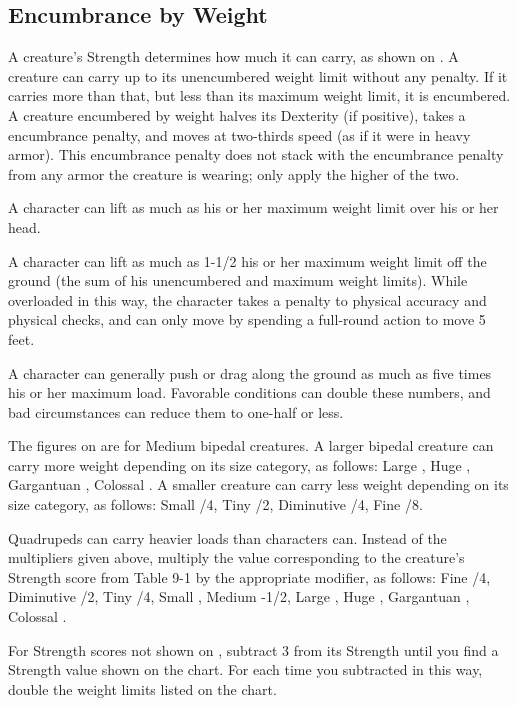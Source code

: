 \subsection{Encumbrance by Weight}
A creature's Strength determines how much it can carry, as shown on . A creature can carry up to its unencumbered weight limit without any penalty. If it carries more than that, but less than its maximum weight limit, it is encumbered. A creature encumbered by weight halves its Dexterity (if positive), takes a  encumbrance penalty, and moves at two-thirds speed (as if it were in heavy armor). This encumbrance penalty does not stack with the encumbrance penalty from any armor the creature is wearing; only apply the higher of the two.

 A character can lift as much as his or her maximum weight limit over his or her head.

A character can lift as much as 1-1/2 his or her maximum weight limit off the ground (the sum of his unencumbered and maximum weight limits). While overloaded in this way, the character takes a  penalty to physical accuracy and physical checks, and can only move by spending a full-round action to move 5 feet.

A character can generally push or drag along the ground as much as five times his or her maximum load. Favorable conditions can double these numbers, and bad circumstances can reduce them to one-half or less.

 The figures on  are for Medium bipedal creatures. A larger bipedal creature can carry more weight depending on its size category, as follows: Large , Huge , Gargantuan , Colossal . A smaller creature can carry less weight depending on its size category, as follows: Small /4, Tiny /2, Diminutive /4, Fine /8.

Quadrupeds can carry heavier loads than characters can. Instead of the multipliers given above, multiply the value corresponding to the creature's Strength score from Table 9-1 by the appropriate modifier, as follows: Fine /4, Diminutive /2, Tiny /4, Small , Medium -1/2, Large , Huge , Gargantuan , Colossal .

 For Strength scores not shown on , subtract 3 from its Strength until you find a Strength value shown on the chart. For each time you subtracted in this way, double the weight limits listed on the chart.

